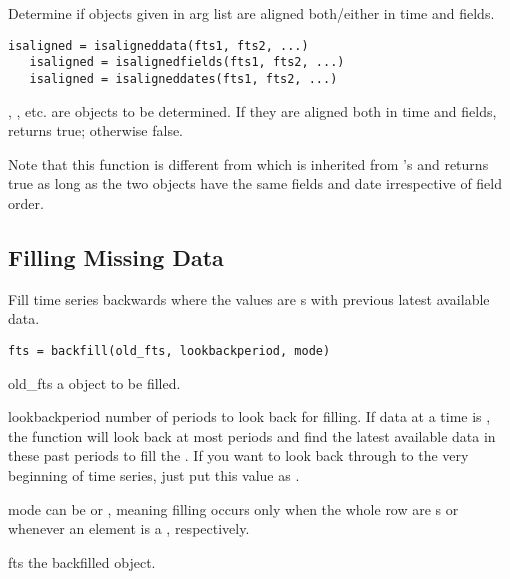    Determine if \myfints{} objects given in arg list are aligned both/either in time and fields.
%
\usage
   \begin{lstlisting}[numbers=none]
   isaligned = isaligneddata(fts1, fts2, ...)
   isaligned = isalignedfields(fts1, fts2, ...)
   isaligned = isaligneddates(fts1, fts2, ...)
   \end{lstlisting}
\where
   , , etc. are \myfints{} objects to be determined. 
   If they are aligned both in  time and fields, returns true; otherwise false.

   Note that this function is different from 
   which is inherited from \matlab's  and returns true as long as the two 
   objects have the same fields and date irrespective of field order.
   
\subsection{Filling Missing Data}

   Fill time series backwards where the values are s with previous latest available data.

\usage
   \begin{lstlisting}[numbers=none]
   fts = backfill(old_fts, lookbackperiod, mode)
   \end{lstlisting}

\inarg
   \begin{argdesc}
   \item [old\_fts]	  a \myfints{} object to be filled. 
   \item [lookbackperiod]   number of periods to look back for filling.
         If data at a time is , 
         the function will look back 
         at most  periods
         and find the latest available data in these past periods to fill the . 
         If you want to look back through to the very beginning of time series, 
         just put this value as .
   \item [mode] can be  or , 
         meaning filling occurs only when the whole row are s or
         whenever an element is a , respectively.
   \end{argdesc}

\outarg
   \begin{argdesc}
   \item [fts] the backfilled \myfints{} object.
   \end{argdesc}


